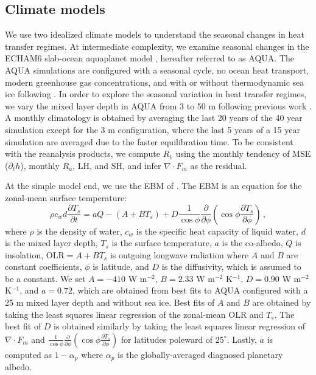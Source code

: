 \documentclass{ametsocV5}
\begin{document}
    \subsection{Climate models}\label{subsec:models}
    We use two idealized climate models to understand the seasonal changes in heat transfer regimes. At intermediate complexity, we examine seasonal changes in the ECHAM6 slab-ocean aquaplanet model \citep{stevens2013}, hereafter referred to as AQUA. The AQUA simulations are configured with a seasonal cycle, no ocean heat transport, modern greenhouse gas concentrations, and with or without thermodynamic sea ice following \cite{shaw2020}. In order to explore the seasonal variation in heat transfer regimes, we vary the mixed layer depth in AQUA from 3 to 50 m following previous work \citep{donohoe2013, barpanda2020}. A monthly climatology is obtained by averaging the last 20 years of the 40 year simulation except for the 3 m configuration, where the last 5 years of a 15 year simulation are averaged due to the faster equilibration time. To be consistent with the reanalysis products, we compute $R_1$ using the monthly tendency of MSE ($\partial_t h$), monthly $R_a$, $\mathrm{LH}$, and $\mathrm{SH}$, and infer $\nabla\cdot F_m $ as the residual.

    At the simple model end, we use the EBM of \cite{rose2017}. The EBM is an equation for the zonal-mean surface temperature:
    \begin{equation}
      \rho c_w d \frac{\partial T_s}{\partial t} = aQ - (A+BT_s)  + D \frac{1}{\cos\phi}\frac{\partial}{\partial \phi}\left( \cos\phi \frac{\partial T_s}{\partial \phi} \right)\, ,
    \end{equation}
    where $\rho$ is the density of water, $c_w$ is the specific heat capacity of liquid water, $d$ is the mixed layer depth, $T_s$ is the surface temperature, $a$ is the co-albedo, $Q$ is insolation, $\mathrm{OLR}=A+BT_s$ is outgoing longwave radiation where $A$ and $B$ are constant coefficients, $\phi$ is latitude, and $D$ is the diffusivity, which is assumed to be a constant. We set $A=-410$ W m$^{-2}$, $B=2.33$ W m$^{-2}$ K$^{-1}$, $D=0.90$ W m$^{-2}$ K$^{-1}$, and $a=0.72$, which are obtained from best fits to AQUA configured with a 25 m mixed layer depth and without sea ice. Best fits of $A$ and $B$ are obtained by taking the least squares linear regression of the zonal-mean $\mathrm{OLR}$ and $T_s$. The best fit of $D$ is obtained similarly by taking the least squares linear regression of $\nabla\cdot F_m$ and $\frac{1}{\cos\phi}\frac{\partial}{\partial \phi} \left( \cos\phi \frac{\partial T_s}{\partial \phi} \right)$ for latitudes poleward of $25^\circ$. Lastly, $a$ is computed as $1-\alpha_p$ where $\alpha_p$ is the globally-averaged diagnosed planetary albedo.
\end{document}
